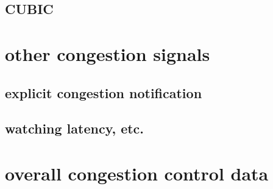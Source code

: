 \subsection{CUBIC}



\section{other congestion signals}



\subsection{explicit congestion notification}


\subsection{watching latency, etc.}



\section{overall congestion control data}

